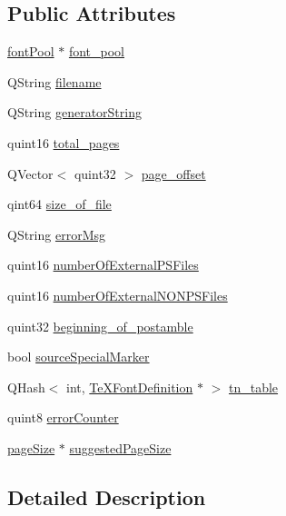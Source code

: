 \subsection*{Public Attributes}
\begin{DoxyCompactItemize}
\item 
\hyperlink{classfontPool}{font\+Pool} $\ast$ \hyperlink{classdvifile_a4864f0edcaad892f4684ab2379f061b9}{font\+\_\+pool}
\item 
Q\+String \hyperlink{classdvifile_a1c0fe420231e71f256b5db367b7e1178}{filename}
\item 
Q\+String \hyperlink{classdvifile_a65f21e8c100dbbf49f160f563d9fda30}{generator\+String}
\item 
quint16 \hyperlink{classdvifile_a71577dbd82a462b855abc96be3b369c5}{total\+\_\+pages}
\item 
Q\+Vector$<$ quint32 $>$ \hyperlink{classdvifile_aeafc97277647ad5077a774be71b3253a}{page\+\_\+offset}
\item 
qint64 \hyperlink{classdvifile_ac136b96471bfd7873dbcb0425240dd0e}{size\+\_\+of\+\_\+file}
\item 
Q\+String \hyperlink{classdvifile_a57d83b062272da49940bb34863d0b595}{error\+Msg}
\item 
quint16 \hyperlink{classdvifile_abd8bd3fc29f66ce9220efbd0246d7fc0}{number\+Of\+External\+P\+S\+Files}
\item 
quint16 \hyperlink{classdvifile_a341ffd0f617655a308d5d86fbb085400}{number\+Of\+External\+N\+O\+N\+P\+S\+Files}
\item 
quint32 \hyperlink{classdvifile_abfe219fd52cec4629815f9f9220401fb}{beginning\+\_\+of\+\_\+postamble}
\item 
bool \hyperlink{classdvifile_a3121bb4c368ca1d30949cffb1df44d81}{source\+Special\+Marker}
\item 
Q\+Hash$<$ int, \hyperlink{classTeXFontDefinition}{Te\+X\+Font\+Definition} $\ast$ $>$ \hyperlink{classdvifile_a05cb283609e6d1627940d14e8fc85b62}{tn\+\_\+table}
\item 
quint8 \hyperlink{classdvifile_a9f1a21857ce4a3eeb9490ea63b1bfdcb}{error\+Counter}
\item 
\hyperlink{classpageSize}{page\+Size} $\ast$ \hyperlink{classdvifile_a9fdbeee20bb39fcafe317925767b24ef}{suggested\+Page\+Size}
\end{DoxyCompactItemize}


\subsection{Detailed Description}


